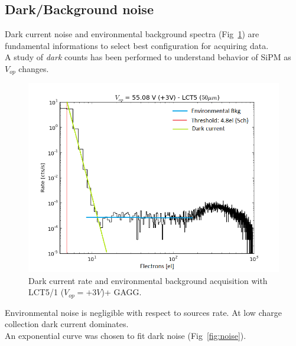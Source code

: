 \documentclass[10pt,a4paper, openany]{book}
\begin{document}
\subsection{Dark/Background noise}
Dark current noise and environmental background spectra (Fig~\ref{fig:fondo}) are fundamental informations to select best configuration for acquiring data.\\
A study of \emph{dark} counts has been performed to understand behavior of SiPM as $V_{op}$ changes.

\begin{figure}[!h]
\begin{center}
\includegraphics[scale=0.5]{imm/fondo.png}
\end{center}
\caption{Dark current rate and environmental background acquisition with LCT5/1 ($V_{op}=+3V$)+ GAGG.}
\label{fig:fondo}
\end{figure}

Environmental noise is negligible with respect to sources rate. At low charge collection dark current dominates.\\
An exponential curve was chosen to fit dark noise (Fig~\ref{fig:noise}). 
\end{document}
